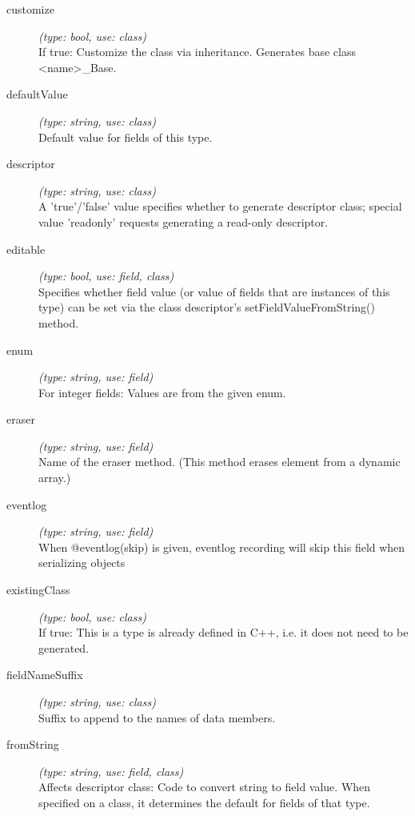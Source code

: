 \begin{description}
\item[customize] \textit{(type: bool, use: class)} \\
    If true: Customize the class via inheritance. Generates base class
    <name>\_Base.

\item[defaultValue] \textit{(type: string, use: class)} \\
    Default value for fields of this type.

\item[descriptor] \textit{(type: string, use: class)} \\
    A 'true'/'false' value specifies whether to generate descriptor class;
    special value 'readonly' requests generating a read-only descriptor.

\item[editable] \textit{(type: bool, use: field, class)} \\
    Specifies whether field value (or value of fields that are instances of this
    type) can be set via the class descriptor's setFieldValueFromString()
    method.

\item[enum] \textit{(type: string, use: field)} \\
    For integer fields: Values are from the given enum.

\item[eraser] \textit{(type: string, use: field)} \\
    Name of the eraser method. (This method erases element from a dynamic
    array.)

\item[eventlog] \textit{(type: string, use: field)} \\
    When @eventlog(skip) is given, eventlog recording will skip this field when
    serializing objects

\item[existingClass] \textit{(type: bool, use: class)} \\
    If true: This is a type is already defined in C++, i.e. it does not need to
    be generated.

\item[fieldNameSuffix] \textit{(type: string, use: class)} \\
    Suffix to append to the names of data members.

\item[fromString] \textit{(type: string, use: field, class)} \\
    Affects descriptor class: Code to convert string to field value. When
    specified on a class, it determines the default for fields of that type.


\end{description}
